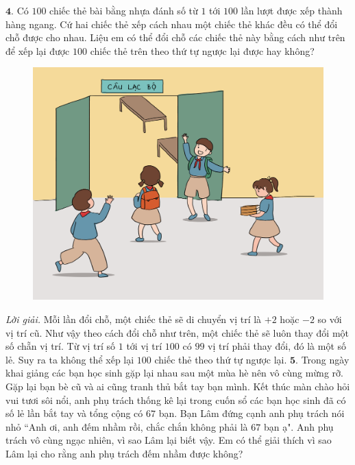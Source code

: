 \begin{multicols}{2}
	\vskip 0.1cm
	$\pmb{4.}$ Có $100$ chiếc thẻ bài bằng nhựa đánh số từ $1$ tới $100$ lần lượt được xếp thành hàng ngang. Cứ hai chiếc thẻ xếp cách nhau một chiếc thẻ khác đều có thể đổi chỗ được cho nhau. Liệu em có thể đổi chỗ các chiếc thẻ này bằng cách như trên để xếp lại được $100$ chiếc thẻ trên theo thứ tự ngược lại được hay không?
	\begin{figure}[H]
		\centering
		\vspace*{-10pt}
		\captionsetup{labelformat= empty, justification=centering}
		\includegraphics[width=0.98\linewidth]{Pi10_ToanBi_Bai4}
		\vspace*{-10pt}
	\end{figure}
	\textit{Lời giải.} 	Mỗi lần đổi chỗ, một chiếc thẻ sẽ di chuyển vị trí là $+2$ hoặc $-2$ so với vị trí cũ. Như vậy theo cách đổi chỗ như trên, một chiếc thẻ sẽ luôn thay đổi một số chẵn vị trí. Từ vị trí số $1$ tới vị trí $100$ có $99$ vị trí phải thay đổi, đó là một số lẻ. Suy ra ta không thể xếp lại $100$ chiếc thẻ theo thứ tự ngược lại.
	\vskip 0.1cm
	$\pmb{5.}$ Trong ngày khai giảng các bạn học sinh gặp lại nhau sau một mùa hè nên vô cùng mừng rỡ. Gặp lại bạn bè cũ và ai cũng tranh thủ bắt tay bạn mình. Kết thúc màn chào hỏi vui tươi sôi nổi, anh phụ trách thống kê lại trong cuốn sổ các bạn học sinh đã có số lẻ lần bắt tay và tổng cộng có $67$ bạn. Bạn Lâm đứng cạnh anh phụ trách nói nhỏ ``Anh ơi, anh đếm nhầm rồi, chắc chắn không phải là $67$ bạn ạ". Anh phụ trách vô cùng ngạc nhiên, vì sao Lâm lại biết vậy. Em có thể giải thích vì sao Lâm lại cho rằng anh phụ trách đếm nhầm được không?
	\begin{figure}[H]

\end{figure}
\end{multicols}
